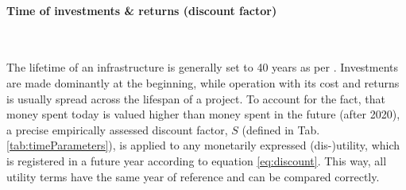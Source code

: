 \begin{comment}
\begin{table}[H]
	\begin{tabular}{l | L | L}
		\centering Simulation parameter & \multicolumn{1}{|c|}{\text{Variable}} & \multicolumn{1}{|c}{\centering \text{Derivation}} \\ \hline \hline
		$\Delta$MPT person dist. & \Delta D_{\text{pers,MPT}} \text{ [km/d]} & D_{\text{pers,MPT|metroScenario}} - D_{\text{pers,MPT|baseScenario}} \\
		$\Delta$PT person dist. & \Delta D_{\text{pers,PT}} \text{ [km/d]} & D_{\text{pers,PT|metroScenario}} - D_{\text{pers,PT|baseScenario}}\\
		$\Delta$Total PT travel time & \Delta t_{pers,PT} \text{ [s/a]} & t_{\text{pers,PT|metroScenario}} - t_{\text{pers,PT|baseScenario}}\\
		$\Delta$Total MPT travel time & \Delta t_{pers,MPT} \text{ [s/a]} & t_{\text{pers,MPT|metroScenario}} - t_{\text{pers,MPT|baseScenario}}\\
		Metro vehicle dist. & D_{veh} \text{ [km/a]} & \sum_{veh}^{} \text{routeLength}\cdot \text{nDailyDepartures}_{veh} \cdot 365 \\ \hline
	\end{tabular}
	\captionsetup{justification=centering}
	\caption{Key data from traffic simulation for utility calculations}
	\label{tab:simdata}
\end{table}
\end{comment}

\paragraph{Time of investments \& returns (discount factor)}\mbox{}\\
\vspace{-5ex} 

The lifetime of an infrastructure is generally set to 40 years as per \citet{VSS_Norm_641820_2006Own}. Investments are made dominantly at the beginning, while operation with its cost and returns is usually spread across the lifespan of a project. To account for the fact, that money spent today is valued higher than money spent in the future (after 2020), a precise empirically assessed discount factor, $S$ \citet{VSS_Norm_KNA641821_2006} (defined in Tab. \ref{tab:timeParameters}), is applied to any monetarily expressed (dis-)utility, which is registered in a future year  according to equation \ref{eq:discount}. This way, all utility terms have the same year of reference and can be compared correctly.

